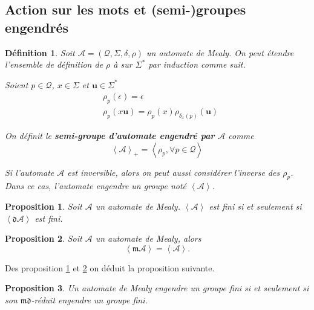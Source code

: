 \documentclass[11pt,a4paper]{article}
\newtheorem{prop}{Proposition}
\newtheorem{definition}{Définition}
\begin{document}
\subsection{Action sur les mots et (semi-)groupes engendrés}

\begin{definition}
  Soit $\mathcal{A}=\left(\mathcal{Q}, \Sigma, \delta, \rho\right)$ un automate de Mealy. On peut étendre l'ensemble de définition de $\rho$ à sur $\Sigma^*$ par induction comme suit.

  Soient $p\in\mathcal{Q}$, $x\in\Sigma$ et $\textbf{u}\in\Sigma^*$
  \begin{align*}
    &\rho_p(\epsilon)=\epsilon \\
    &\rho_p(x\textbf{u})=\rho_p(x)\rho_{\delta_x(p)}(\textbf{u})
  \end{align*}

  On définit le \textbf{semi-groupe d'automate engendré par $\mathcal{A}$} comme
  \begin{equation*}
    \left<\mathcal{A}\right>_+=\left<\rho_p, \forall p\in\mathcal{Q}\right>
  \end{equation*}

  Si l'automate $\mathcal{A}$ est inversible, alors on peut aussi considérer l'inverse des $\rho_p$. Dans ce cas, l'automate engendre un groupe noté $\left<\mathcal{A}\right>$.

\end{definition}

\begin{prop}{\cite{DBLP:journals/corr/abs-1105-4725}}
  \label{prop:finitude-d}
  Soit $\mathcal{A}$ un automate de Mealy. $\left<\mathcal{A}\right>$ est fini si et seulement si $\left<\mathfrak{d}\mathcal{A}\right>$ est fini.
\end{prop}

\begin{prop}{\cite{DBLP:journals/corr/abs-1105-4725}}
  \label{prop:finitude-m}
  Soit $\mathcal{A}$ un automate de Mealy, alors
  \[ \left<\mathfrak{m}\mathcal{A}\right> = \left<\mathcal{A}\right>. \]
\end{prop}

Des proposition \ref{prop:finitude-d} et \ref{prop:finitude-m} on déduit la proposition suivante.

\begin{prop}
  \label{prop:md-trivial}
  Un automate de Mealy engendre un groupe fini si et seulement si son $\mathfrak{md}$-réduit engendre un groupe fini.
\end{prop}
\end{document}
